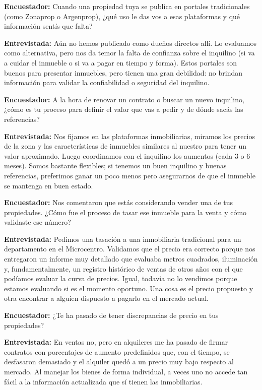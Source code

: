 \textbf{Encuestador:} Cuando una propiedad tuya se publica en portales tradicionales (como Zonaprop o Argenprop), ¿qué uso le das vos a esas plataformas y qué información sentís que falta?

\textbf{Entrevistada:} Aún no hemos publicado como dueños directos allí. Lo evaluamos como alternativa, pero nos da temor la falta de confianza sobre el inquilino (si va a cuidar el inmueble o si va a pagar en tiempo y forma). Estos portales son buenos para presentar inmuebles, pero tienen una gran debilidad: no brindan información para validar la confiabilidad o seguridad del inquilino.

\textbf{Encuestador:} A la hora de renovar un contrato o buscar un nuevo inquilino, ¿cómo es tu proceso para definir el valor que vas a pedir y de dónde sacás las referencias?

\textbf{Entrevistada:} Nos fijamos en las plataformas inmobiliarias, miramos los precios de la zona y las características de inmuebles similares al nuestro para tener un valor aproximado. Luego coordinamos con el inquilino los aumentos (cada 3 o 6 meses). Somos bastante flexibles; si tenemos un buen inquilino y buenas referencias, preferimos ganar un poco menos pero asegurarnos de que el inmueble se mantenga en buen estado.

\textbf{Encuestador:} Nos comentaron que estás considerando vender una de tus propiedades. ¿Cómo fue el proceso de tasar ese inmueble para la venta y cómo validaste ese número?

\textbf{Entrevistada:} Pedimos una tasación a una inmobiliaria tradicional para un departamento en el Microcentro. Validamos que el precio era correcto porque nos entregaron un informe muy detallado que evaluaba metros cuadrados, iluminación y, fundamentalmente, un registro histórico de ventas de otros años con el que podíamos evaluar la curva de precios. Igual, todavía no lo vendimos porque estamos evaluando si es el momento oportuno. Una cosa es el precio propuesto y otra encontrar a alguien dispuesto a pagarlo en el mercado actual.

\textbf{Encuestador:} ¿Te ha pasado de tener discrepancias de precio en tus propiedades?

\textbf{Entrevistada:} En ventas no, pero en alquileres me ha pasado de firmar contratos con porcentajes de aumento predefinidos que, con el tiempo, se desfasaron demasiado y el alquiler quedó a un precio muy bajo respecto al mercado. Al manejar los bienes de forma individual, a veces uno no accede tan fácil a la información actualizada que sí tienen las inmobiliarias.

